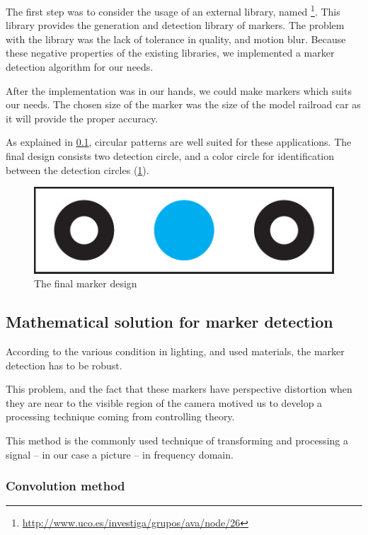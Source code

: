 The first step was to consider the usage of an external library, named \footnote{\url{http://www.uco.es/investiga/grupos/ava/node/26}}. This library provides the generation and detection library of markers. The problem with the library was the lack of tolerance in quality, and motion blur. Because these negative properties of the existing libraries, we implemented a marker detection algorithm for our needs.

After the implementation was in our hands, we could make markers which suits our needs. The chosen size of the marker was the size of the model railroad car as it will provide the proper accuracy.

As explained in \cref{fig:case_study:opencv_math}, circular patterns are well suited for these applications. The final design consists two detection circle, and a color circle for identification between the detection circles (\cref{fig:case_study:final_marker}).

\begin{figure}[h]
	\centering
	\includegraphics[width=0.5\linewidth]{include/figures/chapter_6/opencv_finalmarker}
	\caption{The final marker design}
	\label{fig:case_study:final_marker} 
\end{figure}

\subsection{Mathematical solution for marker detection}
\label{fig:case_study:opencv_math}


According to the various condition in lighting, and used materials, the marker detection has to be robust.

This problem, and the fact that these markers have perspective distortion when they are near to the visible region of the camera motived us to develop a processing technique coming from controlling theory.

This method is the commonly used technique of transforming and processing a signal -- in our case a picture -- in frequency domain.

\subsubsection{Convolution method}
\label{sec:case_study:convolution}

